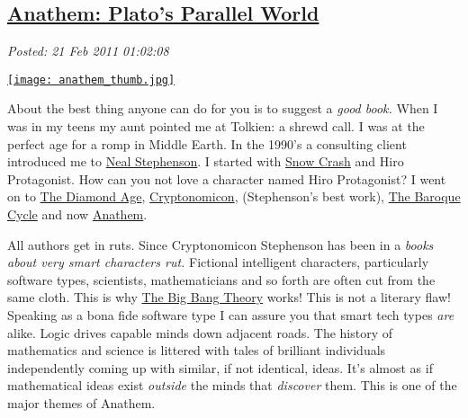 %

\subsection*{\href{http://bakerjd99.wordpress.com/2011/02/20/anathem-platos-parallel-world/}{Anathem: Plato's Parallel World}}


\noindent\emph{Posted: 21 Feb 2011 01:02:08}
\vspace{6pt}

\captionsetup[floatingfigure]{labelformat=empty}
\begin{floatingfigure}[l]{0.25\textwidth}
\centering
\href{http://www.amazon.com/Anathem-Neal-Stephenson/dp/0061474096}{\texttt{[image: anathem\_thumb.jpg]}}
\label{fig:1124X0}
\end{floatingfigure}About the best thing anyone can do for you is to suggest a \emph{good
book.} When I was in my teens my aunt pointed me at Tolkien: a shrewd
call. I was at the perfect age for a romp in Middle Earth. In the 1990's
a consulting client introduced me to
\href{http://www.nealstephenson.com/}{Neal Stephenson}. I started with
\href{http://www.amazon.com/Snow-Crash-Bantam-Spectra-Book/dp/0553380958}{Snow
Crash} and Hiro Protagonist. How can you not love a character named Hiro
Protagonist? I went on to
\href{http://www.amazon.com/Diamond-Age-Neal-Stephenson/dp/0553573314}{The
Diamond Age},
\href{http://www.amazon.com/Cryptonomicon-Neal-Stephenson/dp/0380973464}{Cryptonomicon},
(Stephenson's best work),
\href{http://en.wikipedia.org/wiki/The\_Baroque\_Cycle}{The Baroque
Cycle} and now
\href{http://www.amazon.com/Anathem-Neal-Stephenson/dp/0061474096}{Anathem}.

All authors get in ruts. Since Cryptonomicon Stephenson has been in a
\emph{books about very smart characters rut.} Fictional intelligent
characters, particularly software types, scientists, mathematicians and
so forth are often cut from the same cloth. This is why
\href{http://www.cbs.com/primetime/big\_bang\_theory/}{The Big Bang
Theory} works!
This is not a literary flaw! Speaking as a bona fide software type I can
assure you that smart tech types \emph{are} alike. Logic drives capable
minds down adjacent roads. The history of mathematics and science is
littered with tales of brilliant individuals independently coming up
with similar, if not identical, ideas. It's almost as if mathematical
ideas exist \emph{outside} the minds that \emph{discover} them. This is
one of the major themes of Anathem.

